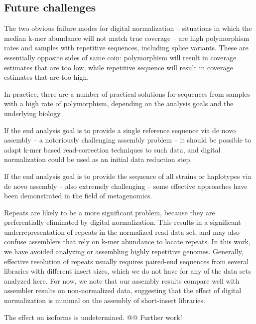 \documentclass[10pt]{article}
\begin{document}

\subsection*{Future challenges}

The two obvious failure modes for digital normalization -- situations
in which the median k-mer abundance will not match true coverage --
are high polymorphism rates and samples with repetitive sequences,
including splice variants.  These are essentially opposite sides of
same coin: polymorphism will result in coverage estimates that are too
low, while repetitive sequence will result in coverage estimates that
are too high.

In practice, there are a number of practical solutions for sequences
from samples with a high rate of polymorphism, depending on the
analysis goals and the underlying biology.

If the end analysis goal is to provide a single reference sequence via
de novo assembly -- a notoriously challenging assembly problem -- it
should be possible to adapt k-mer based read-correction techniques to
such data, and digital normalization could be used as an initial data
reduction step.

If the end analysis goal is to provide the sequence of all strains or
haplotypes via de novo assembly -- also extremely challenging -- some
effective approaches have been demonstrated in the field of
metagenomics.

Repeats are likely to be a more significant problem, because they are
preferentially eliminated by digital normalization.  This results in a
significant underrepresentation of repeats in the normalized read data
set, and may also confuse assemblers that rely on k-mer abundance to
locate repeats.  In this work, we have avoided analyzing or assembling
highly repetitive genomes.  Generally, effective resolution of repeats
usually requires paired-end sequences from several libraries with
different insert sizes, which we do not have for any of the data sets
analyzed here.  For now, we note that our assembly results compare
well with assembler results on non-normalized data, suggesting that
the effect of digital normalization is minimal on the assembly of
short-insert libraries.

The effect on isoforms is undetermined.  @@  Further work!
\end{document}

